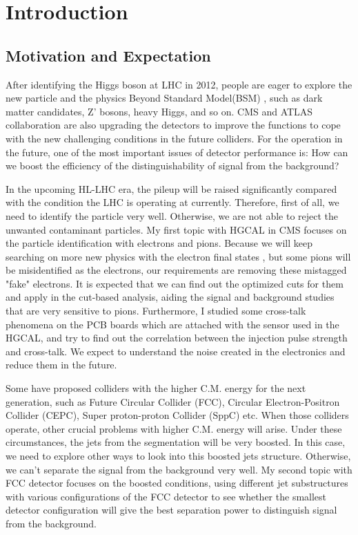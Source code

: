 \section{Introduction}
\subsection{Motivation and Expectation}
After identifying the Higgs boson at LHC in 2012, people are eager to explore the new particle and the physics Beyond Standard Model(BSM) , such as dark matter candidates, Z' bosons, heavy Higgs, and so on. CMS and ATLAS collaboration are also upgrading the detectors to improve the functions to cope with the new challenging conditions in the future colliders. For the operation in the future, one of the most important issues of detector performance is: How can we boost the efficiency of the distinguishability of signal from the background?

In the upcoming HL-LHC era, the pileup will be raised significantly compared with the condition the LHC is operating at currently. Therefore, first of all, we need to identify the particle very well. Otherwise, we are not able to reject the unwanted contaminant particles. My first topic with HGCAL in CMS focuses on the particle identification with electrons and pions. Because we will keep searching on more new physics with the electron final states , but some pions will be misidentified as the electrons, our requirements are removing these mistagged "fake" electrons. It is expected that we can find out the optimized cuts for them and apply in the cut-based analysis, aiding the signal and background studies that are very sensitive to pions. Furthermore, I studied some cross-talk phenomena on the PCB boards which are attached with the sensor used in the HGCAL, and try to find out the correlation between the injection pulse strength and cross-talk. We expect to understand the noise created in the electronics and reduce them in the future.

Some have proposed colliders with the higher C.M. energy for the next generation, such as Future Circular Collider (FCC), Circular Electron-Positron Collider (CEPC), Super proton-proton Collider (SppC) etc. When those colliders operate, other crucial problems with higher C.M. energy will arise. Under these circumstances, the jets from the segmentation will be very boosted. In this case, we need to explore other ways to look into this boosted jets structure. Otherwise, we can't separate the signal from the background very well. My second topic with FCC detector focuses on the boosted conditions, using different jet substructures with various configurations of the FCC detector to see whether the smallest detector configuration will give the best separation power to distinguish signal from the background.
